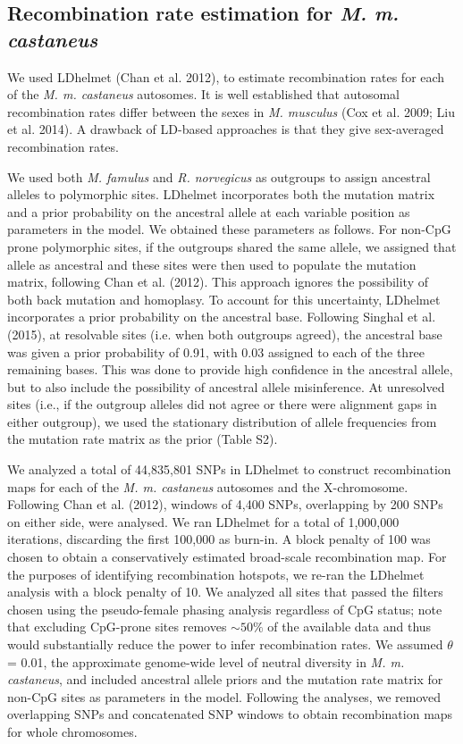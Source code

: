 \subsection{Recombination rate estimation for \emph{M. m. castaneus}}
        	
        We used LDhelmet (Chan et al. 2012), to estimate recombination rates for each of the \emph{M. m. castaneus} autosomes. It is well established that autosomal recombination rates differ between the sexes in \emph{M. musculus} (Cox et al. 2009; Liu et al. 2014). A drawback of LD-based approaches is that they give sex-averaged recombination rates. 
 
        	We used both \emph{M. famulus} and \emph{R. norvegicus} as outgroups to assign ancestral alleles to polymorphic sites. LDhelmet incorporates both the mutation matrix and a prior probability on the ancestral allele at each variable position as parameters in the model. We obtained these parameters as follows. For non-CpG prone polymorphic sites, if the outgroups shared the same allele, we assigned that allele as ancestral and these sites were then used to populate the mutation matrix, following Chan et al. (2012). This approach ignores the possibility of both back mutation and homoplasy. To account for this uncertainty, LDhelmet incorporates a prior probability on the ancestral base. Following Singhal et al. (2015), at resolvable sites (i.e. when both outgroups agreed), the ancestral base was given a prior probability of 0.91, with 0.03 assigned to each of the three remaining bases. This was done to provide high confidence in the ancestral allele, but to also include the possibility of ancestral allele misinference. At unresolved sites (i.e., if the outgroup alleles did not agree or there were alignment gaps in either outgroup), we used the stationary distribution of allele frequencies from the mutation rate matrix as the prior (Table S2).
 
We analyzed a total of 44,835,801 SNPs in LDhelmet to construct recombination maps for each of the \emph{M. m. castaneus} autosomes and the X-chromosome. Following Chan et al. (2012), windows of 4,400 SNPs, overlapping by 200 SNPs on either side, were analysed. We ran LDhelmet for a total of 1,000,000 iterations, discarding the first 100,000 as burn-in. A block penalty of 100 was chosen to obtain a conservatively estimated broad-scale recombination map. For the purposes of identifying recombination hotspots, we re-ran the LDhelmet analysis with a block penalty of 10. We analyzed all sites that passed the filters chosen using the pseudo-female phasing analysis regardless of CpG status; note that excluding CpG-prone sites removes $\sim50\%$ of the available data and thus would substantially reduce the power to infer recombination rates. We assumed $\theta$ = 0.01, the approximate genome-wide level of neutral diversity in \emph{M. m. castaneus}, and included ancestral allele priors and the mutation rate matrix for non-CpG sites as parameters in the model. Following the analyses, we removed overlapping SNPs and concatenated SNP windows to obtain recombination maps for whole chromosomes. 

